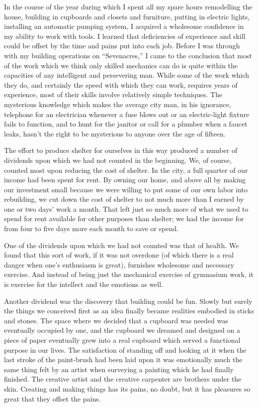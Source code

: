 \documentclass{book}
\begin{document}
In the course of the year during which I spent all my spare hours remodelling the house, building in cupboards and closets and furniture, putting in electric lights, installing an automatic pumping system, I acquired a wholesome confidence in my ability to work with tools. I learned that deficiencies of experience and skill could be offset by the time and pains put into each job. Before I was through with my building operations on “Sevenacres,” I came to the conclusion that most of the work which we think only skilled mechanics can do is quite within the capacities of any intelligent and persevering man. While some of the work which they do, and certainly the speed with which they can work, requires years of experience, most of their skills involve relatively simple techniques. The mysterious knowledge which makes the average city man, in his ignorance, telephone for an electrician whenever a fuse blows out or an electric-light fixture fails to function, and to hunt for the janitor or call for a plumber when a faucet leaks, hasn’t the right to be mysterious to anyone over the age of fifteen.

The effort to produce shelter for ourselves in this way produced a number of dividends upon which we had not counted in the beginning. We, of course, counted most upon reducing the cost of shelter. In the city, a full quarter of our income had been spent for rent. By owning our home, and above all by making our investment small because we were willing to put some of our own labor into rebuilding, we cut down the cost of shelter to not much more than I earned by one or two days’ work a month. That left just so much more of what we used to spend for rent available for other purposes than shelter; we had the income for from four to five days more each month to save or spend.

One of the dividends upon which we had not counted was that of health. We found that this sort of work, if it was not overdone (of which there is a real danger when one’s enthusiasm is great), furnishes wholesome and necessary exercise. And instead of being just the mechanical exercise of gymnasium work, it is exercise for the intellect and the emotions as well.

Another dividend was the discovery that building could be fun. Slowly but surely the things we conceived first as an idea finally became realities embodied in sticks and stones. The space where we decided that a cupboard was needed was eventually occupied by one, and the cupboard we dreamed and designed on a piece of paper eventually grew into a real cupboard which served a functional purpose in our lives. The satisfaction of standing off and looking at it when the last stroke of the paint-brush had been laid upon it was emotionally much the same thing felt by an artist when surveying a painting which he had finally finished. The creative artist and the creative carpenter are brothers under the skin. Creating and making things has its pains, no doubt, but it has pleasures so great that they offset the pains.
\end{document}
